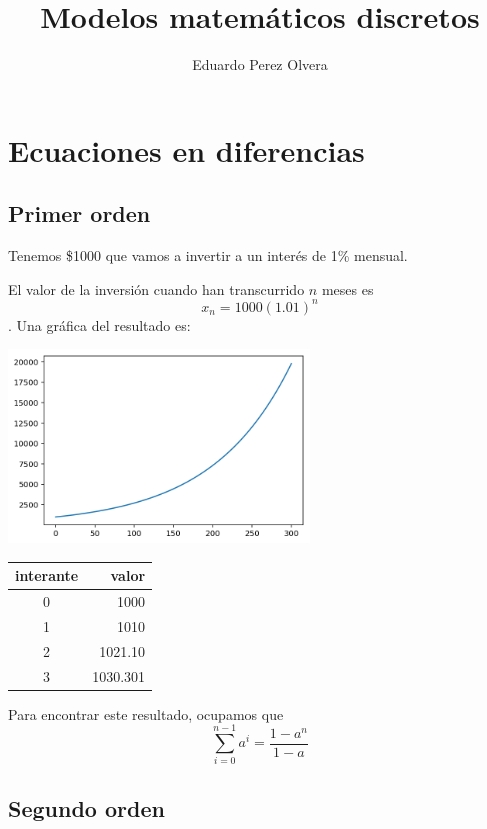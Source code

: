\documentclass{article}
\title{Modelos matemáticos discretos}
\author{Eduardo Perez Olvera}
\begin{document}
\maketitle
\section{Ecuaciones en diferencias}
\subsection{Primer orden}
Tenemos \$1000 que vamos a invertir a un interés de 1\% mensual.

El valor de la inversión cuando han transcurrido $n$ meses es $$x_n=1000(1.01)^n$$.
Una gráfica del resultado es:

\begin{center}
\includegraphics[width=8cm]{a}
\end{center}

\begin{center}\begin{tabular}{|c|r|}
\hline
interante & valor \\
\hline
0 & 1000 \\
\hline
1 & 1010 \\
\hline
2 & 1021.10 \\
\hline
3 & 1030.301\\
\hline
\end{tabular}\end{center}

Para encontrar este resultado, ocupamos que
$$\sum_{i=0}^{n-1}a^i=\frac{1-a^{n}}{1-a}$$
\subsection{Segundo orden}
\end{document}
